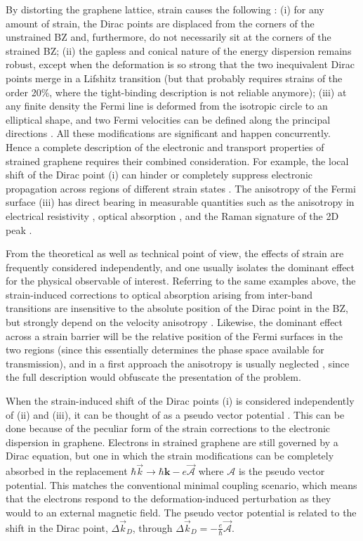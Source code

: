 By distorting the graphene lattice, strain causes the following \cite{Pereira2009}:
(i) for any amount of strain, the Dirac points are displaced from the corners of the unstrained BZ and, furthermore, do not necessarily sit at the corners of the strained BZ;
(ii) the gapless and conical nature of the energy dispersion remains robust, except when the deformation is so strong that the two inequivalent Dirac points merge in a Lifshitz transition (but that probably requires strains of the order 20\%, where the tight-binding description is not reliable anymore);
(iii) at any finite density the Fermi line is deformed from the isotropic circle to an elliptical shape, and two Fermi velocities can be defined along the principal directions \cite{Pereira2009,Pereira2010c,Choi2010}.
All these modifications are significant and happen concurrently. 
Hence a complete description of the electronic and transport properties of strained graphene requires their combined consideration.
For example, the local shift of the Dirac point (i) can hinder or completely suppress electronic propagation across regions of different strain states \cite{Pereira2009a,Fogler2008}.
The anisotropy of the Fermi surface (iii) has direct bearing in measurable quantities such as the anisotropy in electrical resistivity \cite{Kim2009}, optical absorption \cite{Pereira2010c,Pellegrino2010}, and the Raman signature of the 2D peak \cite{Huang2010,Mohr2010a,Frank2011,Yoon2011}.

From the theoretical as well as technical point of view, the effects of strain are frequently considered independently, and one usually isolates the dominant effect for the physical observable of interest.
Referring to the same examples above, the strain-induced corrections to optical absorption arising from inter-band transitions are insensitive to the absolute position of the Dirac point in the BZ, but strongly depend on the velocity anisotropy \cite{Pereira2010c,Pellegrino2010}.
Likewise, the dominant effect across a strain barrier will be the relative position of the Fermi surfaces in the two regions (since this essentially determines the phase space available for transmission), and in a first approach the anisotropy is usually neglected \cite{Fogler2008,Pereira2009a}, since the full description would obfuscate the presentation of the problem.

When the strain-induced shift of the Dirac points (i) is considered independently of (ii) and (iii), it can be thought of as a pseudo vector potential \cite{Sasaki2005,Ando2006,Manes2007,CastroNeto2009,Vozmediano2010}.
This can be done because of the peculiar form of the strain corrections to the electronic dispersion in graphene.
Electrons in strained graphene are still governed by a Dirac equation, but one in which the strain modifications can be completely absorbed in the replacement $\hbar \vec{k} \to \hbar \bm{k}-e \vec{\mathcal{A}}$ where $\bm{\mathcal{A}}$ is the pseudo vector potential.
This matches the conventional minimal coupling scenario, which means that the electrons respond to the deformation-induced perturbation as they would to an external magnetic field.  
The pseudo vector potential is related to the shift in the Dirac point, $\Delta \vec{k}_D$, through $\Delta \vec{k}_D=-\frac{e}{\hbar} \vec{\mathcal{A}}$.

